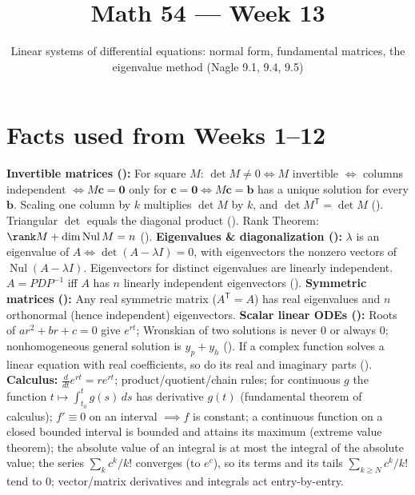 \documentclass[10pt]{scrartcl}
\title{Math 54 --- Week 13}
\subtitle{Linear systems of differential equations: normal form, fundamental matrices, the eigenvalue method (Nagle 9.1, 9.4, 9.5)}
\author{}\date{}\ihead{}
\newcommand{\vv}[1]{\mathbf{#1}}
\DeclareMathOperator{\Nul}{Nul}
\begin{document}
\maketitle

\section{Facts used from Weeks 1--12}
\begin{enumerate}[label=(W\arabic*),leftmargin=2.8em,itemsep=4pt]
  \ii {}\textbf{Invertible matrices ():} For square $M$: $\det M\neq 0\iff M$ invertible $\iff$ columns independent $\iff M\vv c=\vv 0$ only for $\vv c=\vv 0\iff M\vv c=\vv b$ has a unique solution for every $\vv b$. Scaling one column by $k$ multiplies $\det M$ by $k$, and $\det M^{\mathsf T}=\det M$ (). Triangular $\det$ equals the diagonal product (). Rank Theorem: $\rank M+\dim\Nul M=n$ ().
  \ii {}\textbf{Eigenvalues \& diagonalization ():} $\lambda$ is an eigenvalue of $A\iff \det(A-\lambda I)=0$, with eigenvectors the nonzero vectors of $\Nul(A-\lambda I)$. Eigenvectors for distinct eigenvalues are linearly independent. $A=PDP^{-1}$ iff $A$ has $n$ linearly independent eigenvectors ().
  \ii {}\textbf{Symmetric matrices ():} Any real symmetric matrix ($A^{\mathsf T}=A$) has real eigenvalues and $n$ orthonormal (hence independent) eigenvectors.
  \ii {}\textbf{Scalar linear ODEs ():} Roots of $ar^2+br+c=0$ give $e^{rt}$; Wronskian of two solutions is never $0$ or always $0$; nonhomogeneous general solution is $y_p+y_h$ (). If a complex function solves a linear equation with real coefficients, so do its real and imaginary parts ().
  \ii {}\textbf{Calculus:} $\frac{d}{dt}e^{rt}=re^{rt}$; product/quotient/chain rules; for continuous $g$ the function $t\mapsto\int_{t_0}^t g(s)\,ds$ has derivative $g(t)$ (fundamental theorem of calculus); $f'\equiv 0$ on an interval $\implies f$ is constant; a continuous function on a closed bounded interval is bounded and attains its maximum (extreme value theorem); the absolute value of an integral is at most the integral of the absolute value; the series $\sum_k c^k/k!$ converges (to $e^c$), so its terms and its tails $\sum_{k\ge N}c^k/k!$ tend to $0$; vector/matrix derivatives and integrals act entry-by-entry.
\end{enumerate}
\end{document}

